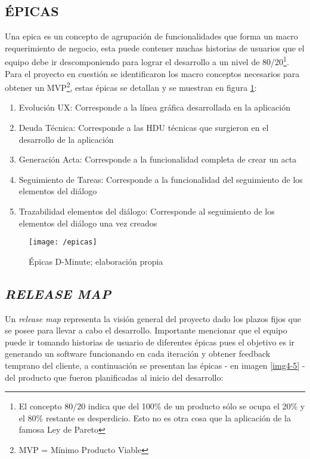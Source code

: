 \subsection{ÉPICAS}

Una epica es un concepto de agrupación  de funcionalidades que forma un macro requerimiento de negocio, esta puede contener muchas historias de usuarios que el equipo debe ir descomponiendo para lograr el desarrollo a un nivel de 80/20\footnote{ El concepto 80/20 indica que del 100\% de un producto sólo se ocupa el 20\% y el 80\% restante es desperdicio. Esto no es otra cosa que la aplicación de la famosa Ley de Pareto}. Para el proyecto en cuestión se identificaron los macro conceptos necesarios para obtener un MVP\footnote{MVP = Mínimo Producto Viable}, estas épicas se detallan y se muestran en figura \ref{img4-4}:

\begin{enumerate}[1.]
   \item Evolución UX: Corresponde a la línea gráfica desarrollada en la aplicación
   \item Deuda Técnica: Corresponde a las HDU técnicas que surgieron en el desarrollo de la aplicación
   \item Generación Acta: Corresponde a la funcionalidad completa de crear un acta
   \item Seguimiento de Tareas: Corresponde a la funcionalidad del seguimiento de los elementos del diálogo
   \item Trazabilidad elementos del diálogo: Corresponde al seguimiento de los elementos del diálogo una vez creados
\end{enumerate}

\begin{figure}[!h]
\centering
\texttt{[image: /epicas]}
\caption{Épicas D-Minute; elaboración propia} 
\label{img4-4}
\end{figure}

\subsection{\textit{RELEASE MAP}}

Un \textit{release map} representa la visión general del proyecto dado los plazos fijos que se posee para llevar a cabo el desarrollo. Importante mencionar que el equipo puede ir tomando historias de usuario de diferentes épicas pues el objetivo es ir generando un software funcionando en cada iteración y obtener feedback temprano del cliente, a continuación se presentan las épicas - en imagen \ref{img4-5} - del producto que fueron planificadas al inicio del desarrollo:

